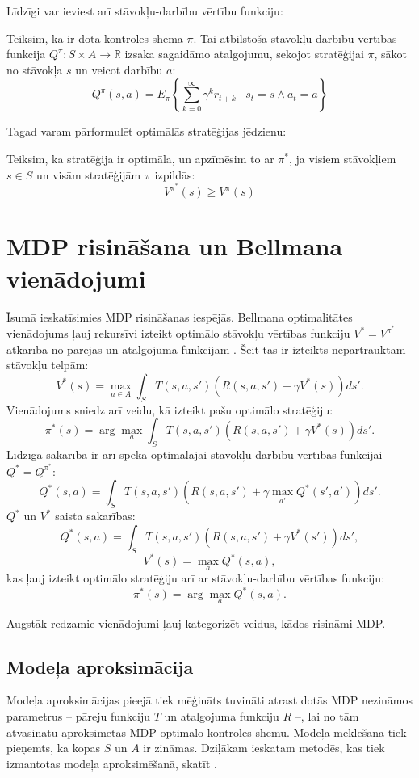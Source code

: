 \documentclass{ludis} %
\begin{document}
Līdzīgi var ieviest arī stāvokļu-darbību vērtību funkciju:
\begin{definicija}
Teiksim, ka ir dota kontroles shēma $\pi$.
Tai atbilstošā stāvokļu-darbību vērtības funkcija $Q^\pi : S \times A
\rightarrow \mathbb{R}$ izsaka sagaidāmo atalgojumu, sekojot stratēģijai $\pi$,
sākot no stāvokļa $s$ un veicot darbību $a$:
\[
	Q^\pi (s,a) = E_\pi \left\{ \sum_{k=0}^{\infty} \gamma^k r_{t+k} \mid s_t = s \land a_t = a\right\}
\]
\end{definicija}

Tagad varam pārformulēt optimālās stratēģijas jēdzienu:
\begin{definicija}
Teiksim, ka stratēģija ir optimāla, un apzīmēsim to ar $\pi^*$, ja visiem
stāvokļiem $s \in S$ un visām stratēģijām $\pi$ izpildās:
\[
	V^{\pi^*}(s) \geq V^{\pi}(s)
\]
\end{definicija}

\section{MDP risināšana un Bellmana vienādojumi}
Īsumā ieskatīsimies MDP risināšanas iespējās. Bellmana optimalitātes vienādojums
ļauj rekursīvi izteikt optimālo stāvokļu vērtības funkciju $V^* = V^{\pi^*}$
atkarībā no pārejas un atalgojuma funkcijām
\autocite{Bel}\autocite{Otterlo}\autocite{Hasselt2012}. Šeit tas ir izteikts
nepārtrauktām stāvokļu telpām: 
\[
	V^*(s) = \max_{a\in A} \int_S T(s,a,s')\left(R(s,a,s') + \gamma V^*(s)\right) ds'.
\]
Vienādojums sniedz arī veidu, kā izteikt pašu optimālo stratēģiju:
\begin{equation}
	\pi^*(s) =  \arg \max_{a} \int_S T(s,a,s')\left(R(s,a,s') + \gamma V^*(s)\right) ds'. \label{eq:1}
\end{equation}
Līdzīga sakarība ir arī spēkā optimālajai stāvokļu-darbību vērtības funkcijai $Q^* = Q^{\pi^*}$:
\[
	Q^*(s, a) = \int_S T(s,a,s')\left(R(s,a,s') + \gamma \max_{a'}Q^*(s',a')\right) ds'.
\]
$Q^*$ un $V^*$ saista sakarības:
\[
	Q^*(s, a) = \int_S T(s,a,s')\left(R(s,a,s') + \gamma V^*(s')\right) ds',
\]
\[
	V^*(s) = \max_{a} Q^*(s,a),
\]
kas ļauj izteikt optimālo stratēģiju arī ar stāvokļu-darbību vērtības funkciju:
\begin{equation}
	\pi^*(s) = \arg \max_a Q^*(s, a). \label{eq:2}
\end{equation}

Augstāk redzamie vienādojumi ļauj kategorizēt veidus, kādos risināmi MDP.

\subsection{Modeļa aproksimācija}
Modeļa aproksimācijas pieejā tiek mēģināts tuvināti atrast dotās MDP nezināmos
parametrus -- pāreju funkciju $T$ un atalgojuma funkciju $R$ --, lai no tām
atvasinātu aproksimētās MDP optimālo kontroles shēmu. Modeļa meklēšanā tiek
pieņemts, ka kopas $S$ un $A$ ir zināmas. Dziļākam ieskatam metodēs, kas tiek
izmantotas modeļa aproksimēšanā, skatīt \autocite{nguyen2011model}.
\end{document}
